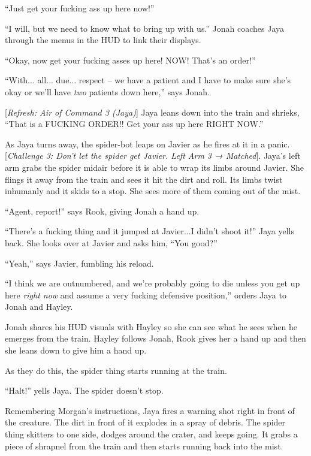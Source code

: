 ``Just get your fucking ass up here now!''

``I will, but we need to know what to bring up with us.''  Jonah coaches Jaya through the menus in the HUD to link their displays.

``Okay, now get your fucking asses up here!  NOW!  That's an order!''

``With... all... due... respect -- we have a patient and I have to make sure she's okay or we'll have \textit{two} patients down here,'' says Jonah.

{[}\textit{Refresh: Air of Command 3 (Jaya)}{]} Jaya leans down into the train and shrieks, ``That is a FUCKING ORDER!!  Get your ass up here RIGHT NOW.''

As Jaya turns away, the spider-bot leaps on Javier as he fires at it in a panic.  {[}\textit{Challenge 3: Don't let the spider get Javier.  Left Arm 3  → Matched}{]}.  Jaya's left arm grabs the spider midair before it is able to wrap its limbs around Javier.  She flings it away from the train and sees it hit the dirt and roll.  Its limbs twist inhumanly and it skids to a stop.  She sees more of them coming out of the mist. 



``Agent, report!'' says Rook, giving Jonah a hand up.

``There's a fucking thing and it jumped at Javier...I didn't shoot it!'' Jaya yells back.  She looks over at Javier and asks him, ``You good?''

``Yeah,'' says Javier, fumbling his reload.

``I think we are outnumbered, and we're probably going to die unless you get up here \textit{right now} and assume a very fucking defensive position,'' orders Jaya to Jonah and Hayley.

Jonah shares his HUD visuals with Hayley so she can see what he sees when he emerges from the train.  Hayley follows Jonah, Rook gives her a hand up and then she leans down to give him a hand up.



As they do this, the spider thing starts running at the train. 

``Halt!'' yells Jaya.  The spider doesn't stop.

Remembering Morgan's instructions, Jaya fires a warning shot right in front of the creature. The dirt in front of it explodes in a spray of debris.  The spider thing skitters to one side, dodges around the crater, and keeps going.  It grabs a piece of shrapnel from the train and then starts running back into the mist.

